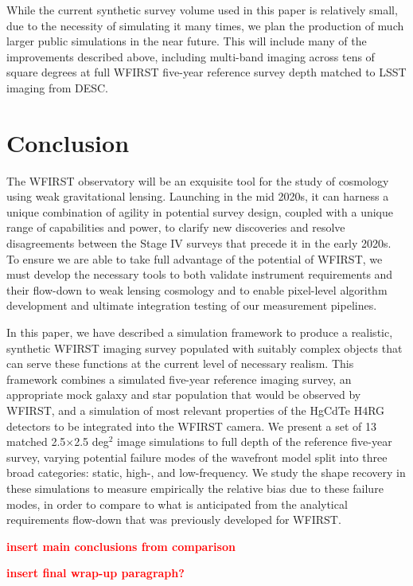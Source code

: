 \documentclass[aps,prd, amsmath,amssymb,superscriptaddress,showkeys,nofootinbib,reprint,preprintnumbers]{revtex4-1}
\newcommand{\verify}[1]{\textcolor{red}{\textbf{{#1}}}}
\begin{document}
While the current synthetic survey volume used in this paper is relatively small, due to the necessity of simulating it many times, we plan the production of much larger public simulations in the near future. 
This will include many of the improvements described above, including multi-band imaging across tens of square degrees at full WFIRST five-year reference survey depth matched to LSST imaging from DESC. 

\section{Conclusion}\label{sec:conclusion}

The WFIRST observatory will be an exquisite tool for the study of cosmology using weak gravitational lensing. 
Launching in the mid 2020s, it can harness a unique combination of agility in potential survey design, coupled with a unique range of capabilities and power, to clarify new discoveries and resolve disagreements between the Stage IV surveys that precede it in the early 2020s. 
To ensure we are able to take full advantage of the potential of WFIRST, we must develop the necessary tools to both validate instrument requirements and their flow-down to weak lensing cosmology and to enable pixel-level algorithm development and ultimate integration testing of our measurement pipelines.

In this paper, we have described a simulation framework to produce a realistic, synthetic WFIRST imaging survey populated with suitably complex objects that can serve these functions at the current level of necessary realism. 
This framework combines a simulated five-year reference imaging survey, an appropriate mock galaxy and star population that would be observed by WFIRST, and a simulation of most relevant properties of the HgCdTe H4RG detectors to be integrated into the WFIRST camera. 
We present a set of 13 matched 2.5$\times$2.5 deg$^2$ image simulations to full depth of the reference five-year survey, varying potential failure modes of the wavefront model split into three broad categories: static, high-, and low-frequency.
We study the shape recovery in these simulations to measure empirically the relative bias due to these failure modes, in order to compare to what is anticipated from the analytical requirements flow-down that was previously developed for WFIRST.  

\verify{insert main conclusions from comparison}

\verify{insert final wrap-up paragraph?}
\end{document}
